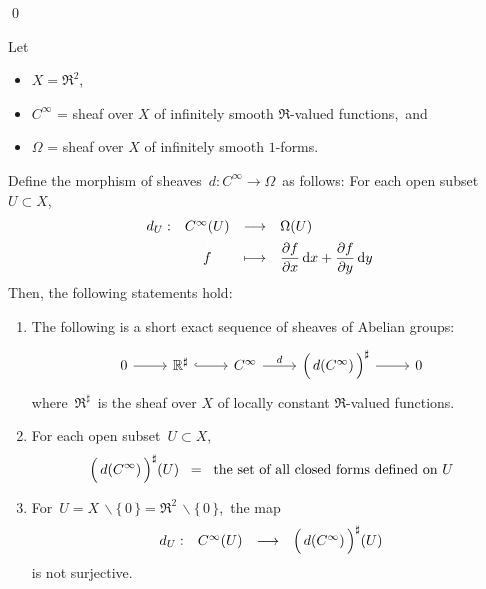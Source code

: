 \qed


\vskip 1.0cm
\begin{example}
\mbox{}\vskip 0.2cm
\noindent
Let
\begin{itemize}
\item
	$X = \Re^{2}$,\,
\item
	$C^{\infty}$ = sheaf over $X$ of infinitely smooth $\Re$-valued functions,\, and
\item
	$\Omega$ = sheaf over $X$ of infinitely smooth $1$-forms.
\end{itemize}
Define the morphism of sheaves
\,$d : C^{\infty} \longrightarrow \Omega$\,
as follows:
For each open subset $U \subset X$,
\begin{equation*}
\begin{array}{cccl}
d_{U} : & C^{\infty}(U) & \longrightarrow & \Omega(U)
\\
& \overset{{\color{white}\textnormal{\Large$1$}}}{f} & \longmapsto & \dfrac{\partial f}{\partial x}\,\d x +  \dfrac{\partial f}{\partial y}\,\d y
\end{array}
\end{equation*}
Then, the following statements hold:
\begin{enumerate}
\item
	The following is a short exact sequence of sheaves of Abelian groups:
	\begin{equation*}
	\begin{tikzcd}
	0                 \arrow[r] &
	\Re^{\sharp} \arrow[r, hook] &
	C^{\infty} \arrow[r, "d"] &
	\left(\,\overset{{\color{white}.}}{d(C^{\infty})}\,\right)^{\sharp} \arrow[r] &
	0
	\end{tikzcd}
	\end{equation*}
	where \,$\Re^{\sharp}$\, is the sheaf over $X$ of locally constant $\Re$-valued functions.
\item
	For each open subset \,$U \subset X$,\,
	\begin{equation*}
	\left(\,\overset{{\color{white}.}}{d(C^{\infty})}\,\right)^{\sharp}\!(U)
	\;\; = \;\;
		\textnormal{the set of all closed forms defined on $U$}
	\end{equation*}
\item
	For \,$U = X \,\backslash \{\,0\,\} = \Re^{2} \,\backslash \{\,0\,\}$,\,
	the map
	\begin{equation*}
	\begin{array}{cccl}
	d_{U} : & C^{\infty}(U) & \longrightarrow & \left(\,\overset{{\color{white}.}}{d(C^{\infty})}\,\right)^{\sharp}\!(U)
	\end{array}
	\end{equation*}
	is not surjective.
\end{enumerate}
\end{example}
